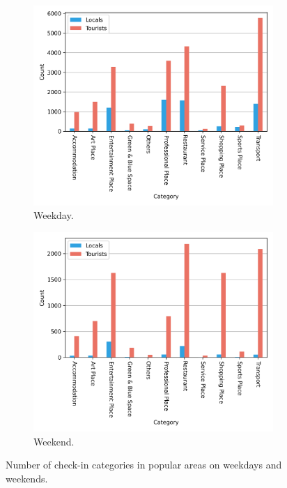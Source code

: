 \documentclass{article}
\theoremstyle{remark}
\begin{document}
\begin{figure}[!h]

\begin{subfigure}{0.5\textwidth}
\includegraphics[width=1\linewidth]{figures/diff_pop_category_weekday.png} 
\caption{Weekday.}
\label{fig:diff_pop_category_weekday}
\end{subfigure}
\begin{subfigure}{0.5\textwidth}
\includegraphics[width=1\linewidth]{figures/diff_pop_category_weekend.png}
\caption{Weekend.}
\label{fig:diff_pop_category_weekend}
\end{subfigure}

\caption{Number of check-in categories in popular areas on weekdays and weekends.} \label{fig:diff_pop_category_week}
\end{figure}
\end{document}
